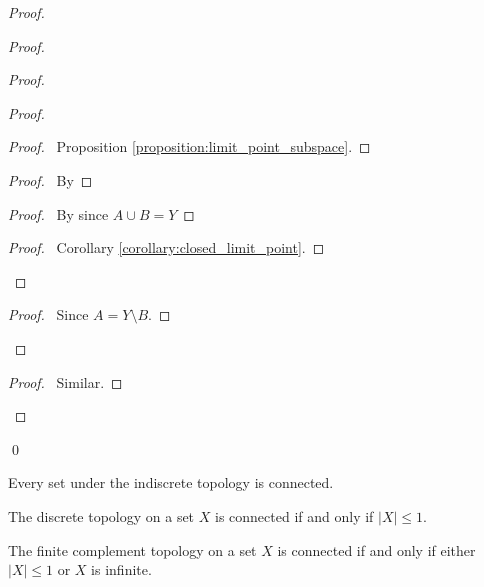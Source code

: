 \begin{proof}
\begin{proof}
        \begin{proof}
            \begin{proof}
                \begin{proof}
                    \pf\ Proposition \ref{proposition:limit_point_subspace}.
                \end{proof}
                \begin{proof}
                    \pf\ By 
                \end{proof}
                \begin{proof}
                    \pf\ By  since $A \cup B = Y$
                \end{proof}
                \qedstep
                \begin{proof}
                    \pf\ Corollary \ref{corollary:closed_limit_point}.
                \end{proof}
            \end{proof}
            \qedstep
            \begin{proof}
                \pf\ Since $A = Y \setminus B$.
            \end{proof}
        \end{proof}
        \begin{proof}
            \pf\ Similar.
        \end{proof}
    \end{proof}
    \qed
\end{proof}

\begin{example}
    Every set under the indiscrete topology is connected.
\end{example}

\begin{example}
    The discrete topology on a set $X$ is connected if and only if $|X| \leq 1$.
\end{example}

\begin{example}
    The finite complement topology on a set $X$ is connected if and only if either $|X| \leq 1$ or $X$ is infinite.
\end{example}

